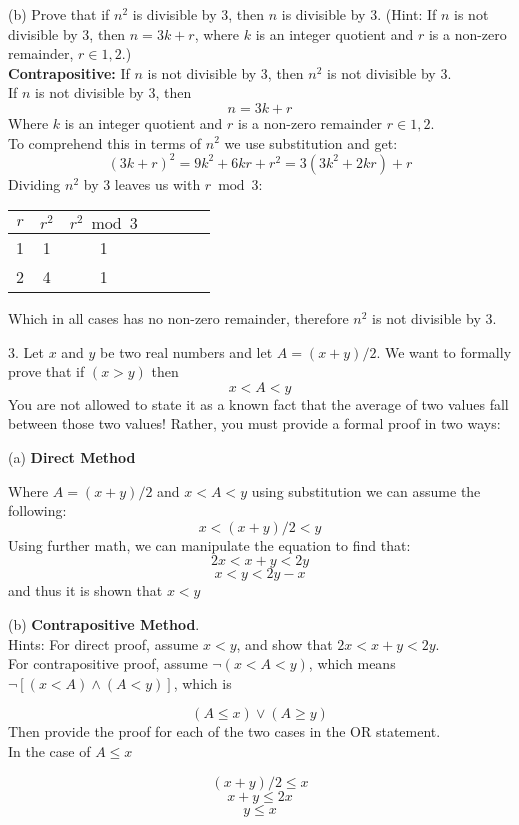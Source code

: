 \documentclass[10pt]{article}
\begin{document}
(b) Prove that if $n^2$ is divisible by 3, then $n$ is divisible by 3. (Hint: If $n$ is not divisible by 3, then $n = 3k +r$, where $k$ is an integer quotient and $r$ is a non-zero remainder, $r \in{1,2} $.)\\
\textbf{Contrapositive:} If $n$ is not divisible by 3, then $n^2$ is not divisible by 3.\\
If $n$ is not divisible by 3, then
$$n = 3k + r$$ 
Where $k$ is an integer quotient and $r$ is a non-zero remainder $r \in{1,2}$.\\
To comprehend this in terms of $n^2$ we use substitution and get:
$$(3k +r)^2 = 9k^2 + 6kr + r^2 = 3(3k^2 + 2kr) + r$$
Dividing $n^2$ by 3 leaves us with $r \bmod 3$:
\center
\begin{tabular}{@{ }c@{ }@{ }|c | c@{ }@{ }c@{ }@{ }c@{ }@{ }c@{ }@{ }c}
$r$ & $r^2$ & $ r^2 \bmod 3 $ & & & & \\
\hline 
1 & 1 & 1 &  & \\
2 & 4 & 1 &  & \\
\end{tabular}
\flushleft
Which in all cases has no non-zero remainder, therefore $n^2$ is not divisible by 3.

3. Let $x$ and $y$ be two real numbers and let $A = (x + y)/2$.  We want to formally prove that if $(x > y)$ then
$$x < A < y$$
You are not allowed to state it as a known fact that the average of two values fall between those two values!  Rather, you must provide a formal proof in two ways:

(a) \textbf{Direct Method}

Where $A = (x + y)/2$ and $x < A < y$ using substitution we can assume the following:
$$x < (x + y)/2 < y$$
Using further math, we can manipulate the equation to find that:
$$2x < x + y < 2y$$
$$x < y < 2y - x$$
and thus it is shown that $x < y$

(b) \textbf{Contrapositive Method}.\\
Hints: For direct proof, assume $x < y$, and show that $2x < x + y < 2y$.\\
For contrapositive proof, assume $\neg(x < A < y)$, which means $\neg[(x < A)\wedge (A < y)]$, which is

$$(A \leq x) \vee (A \geq y)$$
Then provide the proof for each of the two cases in the OR statement.\\

In the case of $A \leq x$

$$(x + y)/2 \leq x$$
$$x + y \leq 2x$$
$$y \leq x$$
\end{document}

